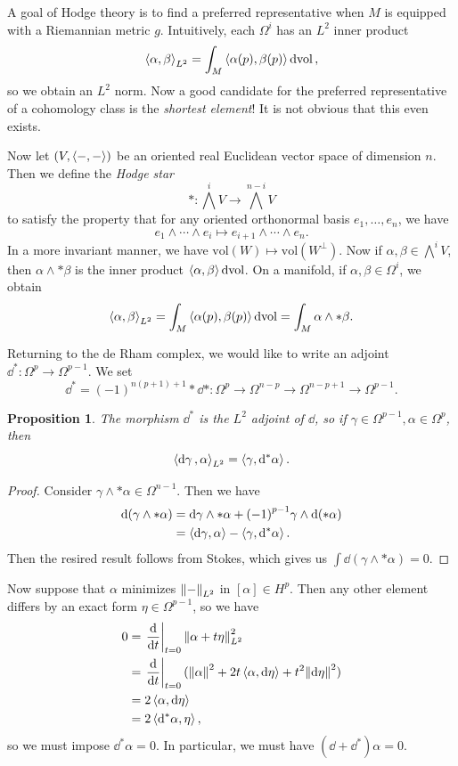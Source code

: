 \documentclass[leqno, openany]{memoir}
\newtheorem{prop}[thm]{Proposition}
\theoremstyle{definition}
\theoremstyle{remark}
\theoremstyle{plain}
\theoremstyle{definition}
\theoremstyle{remark}
\newcommand{\mr}[1]{\mathrm{#1}}
\begin{document}
A goal of Hodge theory is to find a preferred representative when $M$ is
equipped with a Riemannian metric $g$. Intuitively, each $\Omega^i$ has an
$L^2$ inner product \[ \ev{\alpha, \beta}_{L^2} = \int_M \ev{\alpha(p),
\beta(p)} \dd{\mr{vol}}, \] so we obtain an $L^2$ norm. Now a good candidate
for the preferred representative of a cohomology class is the \textit{shortest
element}! It is not obvious that this even exists. 

Now let $(V, \ev{-,-})$ be an oriented real Euclidean vector space of dimension
$n$. Then we define the \textit{Hodge star} \[ * \colon {\bigwedge}^i V \to
{\bigwedge}^{n-i} V \] to satisfy the property that for any oriented
orthonormal basis $e_1, \ldots, e_n$, we have \[ e_1 \wedge \cdots \wedge e_i
\mapsto e_{i+1} \wedge \cdots \wedge e_n. \] In a more invariant manner, we
have $\mr{vol}(W) \mapsto \mr{vol}(W^{\perp})$. Now if $\alpha, \beta \in
\bigwedge^i V$, then $\alpha \wedge *\beta$ is the inner product
$\ev{\alpha,\beta} \dd{\mr{vol}}$. On a manifold, if $\alpha, \beta \in
\Omega^i$, we obtain \[ \ev{\alpha, \beta}_{L^2} = \int_M \ev{\alpha(p),
\beta(p)} \dd{\mr{vol}} = \int_M \alpha \wedge *\beta. \]

Returning to the de Rham complex, we would like to write an adjoint $\dd^*
\colon \Omega^p \to \Omega^{p-1}$. We set \[ \dd^* = {(-1)}^{n(p+1)+1} * \dd *
\colon \Omega^p \to \Omega^{n-p} \to \Omega^{n-p+1} \to \Omega^{p-1}. \]

\begin{prop} The morphism $\dd^*$ is the $L^2$ adjoint of $\dd$, so if $\gamma
    \in \Omega^{p-1}, \alpha \in \Omega^p$, then \[ \ev{\dd{\gamma},
    \alpha}_{L^2} = \ev{\gamma, \dd^* \alpha}. \] \end{prop}

\begin{proof} Consider $\gamma \wedge * \alpha \in \Omega^{n-1}$. Then we have
    \begin{align*} \dd{(\gamma \wedge * \alpha)} &= \dd{\gamma} \wedge * \alpha
        + {(-1)}^{p-1} \gamma \wedge \dd{(* \alpha)} \\ &= \ev{\dd \gamma,
        \alpha} - \ev{\gamma, \dd^* \alpha}.  \end{align*} Then the resired
    result follows from Stokes, which gives us $\int \dd{(\gamma \wedge *
\alpha)} = 0$.  \end{proof}

Now suppose that $\alpha$ minimizes $\norm{-}_{L^2}$ in $[\alpha] \in H^p$.
Then any other element differs by an exact form $\eta \in \Omega^{p-1}$, so we
have \begin{align*} 0 &= \eval{\dv{t}}_{t=0} \norm{\alpha + t \eta}_{L^2}^2 \\
&= \eval{ \dv{t} }_{t=0} (\norm{\alpha}^2 + 2 t \ev{\alpha, \dd{\eta}} + t^2
\norm{\dd{\eta}}^2) \\ &= 2 \ev{\alpha, \dd{\eta}} \\ &= 2 \ev{\dd^* \alpha,
\eta}, \end{align*} so we must impose $\dd^* \alpha = 0$. In particular, we
must have $(\dd + \dd^*) \alpha = 0$.
\end{document}
